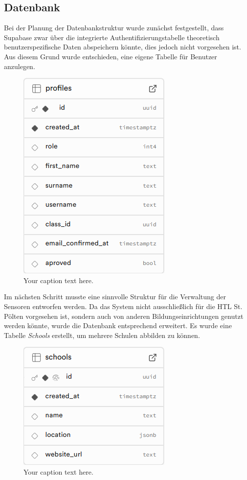 \begin{inhalt}
\section{Datenbank}

Bei der Planung der Datenbankstruktur wurde zunächst festgestellt, dass Supabase zwar über die integrierte Authentifizierungstabelle theoretisch benutzerspezifische Daten abspeichern könnte, dies jedoch nicht vorgesehen ist. Aus diesem Grund wurde entschieden, eine eigene Tabelle für Benutzer anzulegen.

\begin{figure}[!htb]
  \centering
  \includegraphics[scale=0.45]{files/Thomas/pics/Datenbank_Design/profiles.png}
  \caption[Bildbezeichnung für Abbildungsverzeichnis]{Your caption text here.}
  \label{fig:gehaeuse_internet_bild}
\end{figure}

Im nächsten Schritt musste eine sinnvolle Struktur für die Verwaltung der Sensoren entworfen werden. Da das System nicht ausschließlich für die HTL St. Pölten vorgesehen ist, sondern auch von anderen Bildungseinrichtungen genutzt werden könnte, wurde die Datenbank entsprechend erweitert. Es wurde eine Tabelle \textit{Schools} erstellt, um mehrere Schulen abbilden zu können.

\begin{figure}[!htb]
  \centering
  \includegraphics[scale=0.45]{files/Thomas/pics/Datenbank_Design/school.png}
  \caption[Bildbezeichnung für Abbildungsverzeichnis]{Your caption text here.}
  \label{fig:gehaeuse_internet_bild}
\end{figure}


\end{inhalt}
